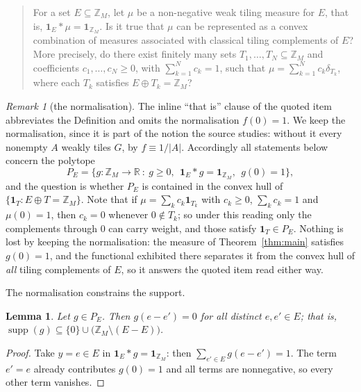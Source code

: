 \documentclass[11pt]{amsart}
\newtheorem{lemma}[theorem]{Lemma}
\theoremstyle{definition}
\theoremstyle{remark}
\newtheorem*{remark}{Remark}
\DeclareMathOperator{\supp}{supp}
\newcommand{\ZM}{\mathbb Z_M}
\newcommand{\one}{\mathbf 1}
\begin{document}
\begin{quote}
For a set $E\subseteq\ZM$, let $\mu$ be a non-negative weak tiling measure for
$E$, that is, $\one_E*\mu=\one_{\ZM}$. Is it true that $\mu$ can be represented
as a convex combination of measures associated with classical tiling
complements of $E$? More precisely, do there exist finitely many sets
$T_1,\ldots,T_N\subseteq\ZM$ and coefficients $c_1,\ldots,c_N\ge0$, with
$\sum_{k=1}^N c_k=1$, such that $\mu=\sum_{k=1}^N c_k\delta_{T_k}$, where each
$T_k$ satisfies $E\oplus T_k=\ZM$?
\end{quote}

\begin{remark}[the normalisation]\label{rem:pin}
The inline ``that is'' clause of the quoted item abbreviates the Definition and
omits the normalisation $f(0)=1$. We keep the normalisation, since it is part of
the notion the source studies: without it every nonempty $A$ weakly tiles $G$,
by $f\equiv 1/|A|$. Accordingly all statements below concern the polytope
\begin{equation}\label{eq:PE}
  P_E=\bigl\{g\colon\ZM\to\mathbb R \ :\ g\ge0,\ \ \one_E*g=\one_{\ZM},\ \ g(0)=1\bigr\},
\end{equation}
and the question is whether $P_E$ is contained in the convex hull of
$\{\one_T : E\oplus T=\ZM\}$. Note that if $\mu=\sum_k c_k\one_{T_k}$ with
$c_k\ge0$, $\sum_k c_k=1$ and $\mu(0)=1$, then $c_k=0$ whenever $0\notin T_k$;
so under this reading only the complements through $0$ can carry weight, and
those satisfy $\one_T\in P_E$. Nothing is lost by keeping the normalisation:
the measure of Theorem~\ref{thm:main} satisfies $g(0)=1$, and the functional
exhibited there separates it from the convex hull of \emph{all} tiling
complements of $E$, so it answers the quoted item read either way.
\end{remark}

The normalisation constrains the support.

\begin{lemma}\label{lem:pin}
Let $g\in P_E$. Then $g(e-e')=0$ for all distinct $e,e'\in E$; that is,
$\supp(g)\subseteq\{0\}\cup\bigl(\ZM\setminus(E-E)\bigr)$.
\end{lemma}

\begin{proof}
Take $y=e\in E$ in $\one_E*g=\one_{\ZM}$: then
$\sum_{e'\in E}g(e-e')=1$. The term $e'=e$ already contributes $g(0)=1$ and all
terms are nonnegative, so every other term vanishes.
\end{proof}
\end{document}
